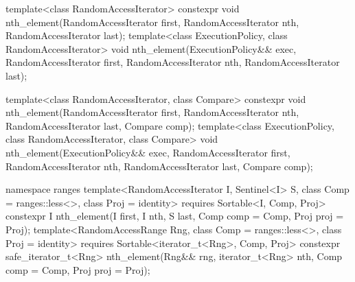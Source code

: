%
\begin{itemdecl}
template<class RandomAccessIterator>
  constexpr void nth_element(RandomAccessIterator first, RandomAccessIterator nth,
                             RandomAccessIterator last);
template<class ExecutionPolicy, class RandomAccessIterator>
  void nth_element(ExecutionPolicy&& exec,
                   RandomAccessIterator first, RandomAccessIterator nth,
                   RandomAccessIterator last);

template<class RandomAccessIterator, class Compare>
  constexpr void nth_element(RandomAccessIterator first, RandomAccessIterator nth,
                             RandomAccessIterator last,  Compare comp);
template<class ExecutionPolicy, class RandomAccessIterator, class Compare>
  void nth_element(ExecutionPolicy&& exec,
                   RandomAccessIterator first, RandomAccessIterator nth,
                   RandomAccessIterator last, Compare comp);
\end{itemdecl}
\begin{addedblock}
\begin{itemdecl}
namespace ranges {
  template<RandomAccessIterator I, Sentinel<I> S, class Comp = ranges::less<>,
      class Proj = identity>
    requires Sortable<I, Comp, Proj>
    constexpr I
      nth_element(I first, I nth, S last, Comp comp = Comp{}, Proj proj = Proj{});
  template<RandomAccessRange Rng, class Comp = ranges::less<>, class Proj = identity>
    requires Sortable<iterator_t<Rng>, Comp, Proj>
    constexpr safe_iterator_t<Rng>
      nth_element(Rng&& rng, iterator_t<Rng> nth, Comp comp = Comp{}, Proj proj = Proj{});
}
\end{itemdecl}
\end{addedblock}

